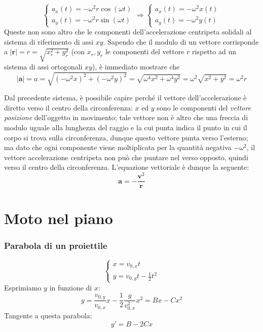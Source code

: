 \[
    \begin{cases}
        a_x(t) = -\omega^2 r\cos(\omega t)\\
        a_y(t) = -\omega^2 r\sin(\omega t)
    \end{cases}
    \Rightarrow
    \begin{cases}
        a_x(t) = -\omega^2 x(t)\\
        a_y(t) = -\omega^2 y(t)
    \end{cases}
\]
Queste non sono altro che le componenti dell'accelerazione centripeta
solidali al sistema di riferimento di assi $xy$. Sapendo che il modulo
di un vettore corrisponde a $|\mathbf{r}| = r = \sqrt{x_r^2 + y_r^2}$
(con $x_r,y_r$ le componenti del vettore $r$ rispetto ad un sistema di
assi ortogonali $xy$), è immediato mostrare che
\[ |\mathbf{a}| = a = \sqrt{(-\omega^2 x)^2 + (-\omega^2 y)^2} = \sqrt{\omega^4x^2 + \omega^4y^2} = \omega^2 \sqrt{x^2 + y^2} = \omega^2 r \]

Dal precedente sistema, è possibile capire perché il vettore dell'accelerazione
è diretto verso il centro della circonferenza: $x$ ed $y$ sono le componenti
del \textit{vettore posizione} dell'oggetto in movimento; tale vettore
non è altro che una freccia di modulo uguale alla lunghezza del raggio e la
cui punta indica il punto in cui il corpo si trova sulla circonferenza,
dunque questo vettore punta verso l'esterno; ma dato che ogni componente
viene moltiplicata per la quantità negativa $-\omega^2$, il vettore
accelerazione centripeta non può che puntare nel verso opposto, quindi
verso il centro della circonferenza. L'equazione vettoriale è dunque la
seguente:
\[ \mathbf{a} = -\frac{\mathbf{v}^2}{\mathbf{r}} \]

\section{Moto nel piano}

\subsubsection*{Parabola di un proiettile}
\[
    \begin{cases}
        x = v_{0,x}t\\
        y = v_{0,y}t - \frac{1}{2}t^2
    \end{cases}
\]
Esprimiamo $y$ in funzione di $x$:
\[
    y = \frac{v_{0,y}}{v_{0,x}}x - \frac{1}{2}\frac{g}{v_{0,x}^2}x^2 = Bx - Cx^2
\]
Tangente a questa parabola:
\[
    y' = B - 2Cx
\]

